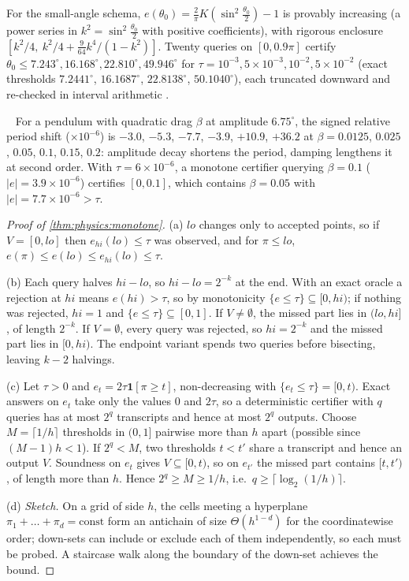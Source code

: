 For the small-angle schema, $e(\theta_0)=\frac2\pi K(\sin^2\frac{\theta_0}2)-1$ is provably
increasing (a power series in $k^2=\sin^2\frac{\theta_0}2$ with positive coefficients), with
rigorous enclosure $[k^2/4,\ k^2/4+\frac9{64}k^4/(1-k^2)]$. Twenty queries on $[0,0.9\pi]$
certify $\theta_0\le7.243^\circ,16.168^\circ,22.810^\circ,49.946^\circ$ for
$\tau=10^{-3},5\times10^{-3},10^{-2},5\times10^{-2}$ (exact thresholds $7.2441^\circ$,
$16.1687^\circ$, $22.8138^\circ$, $50.1040^\circ$), each truncated downward and re-checked in
interval arithmetic .

\begin{proposition}\ \label{prop:physics:laymon}
For a pendulum with quadratic drag $\beta$ at amplitude $6.75^\circ$, the signed relative
period shift ($\times10^{-6}$) is $-3.0$, $-5.3$, $-7.7$, $-3.9$, $+10.9$, $+36.2$ at
$\beta=0.0125$, $0.025$, $0.05$, $0.1$, $0.15$, $0.2$: amplitude decay shortens the period,
damping lengthens it at second order. With $\tau=6\times10^{-6}$, a monotone certifier querying $\beta=0.1$
($|e|=3.9\times10^{-6}$) certifies $[0,0.1]$, which contains $\beta=0.05$ with
$|e|=7.7\times10^{-6}>\tau$.
\end{proposition}

\begin{proof}[Proof of \cref{thm:physics:monotone}]
(a) $lo$ changes only to accepted points, so if $V=[0,lo]$ then $e_{hi}(lo)\le\tau$ was
observed, and for $\pi\le lo$, $e(\pi)\le e(lo)\le e_{hi}(lo)\le\tau$.

(b) Each query halves $hi-lo$, so $hi-lo=2^{-k}$ at the end. With an exact oracle a rejection
at $hi$ means $e(hi)>\tau$, so by monotonicity $\{e\le\tau\}\subseteq[0,hi)$; if nothing was
rejected, $hi=1$ and $\{e\le\tau\}\subseteq[0,1]$. If $V\neq\emptyset$, the missed part lies
in $(lo,hi]$, of length $2^{-k}$. If $V=\emptyset$, every query was rejected, so $hi=2^{-k}$
and the missed part lies in $[0,hi)$. The endpoint variant spends two queries before
bisecting, leaving $k-2$ halvings.

(c) Let $\tau>0$ and $e_t=2\tau\mathbf 1[\pi\ge t]$, non-decreasing with $\{e_t\le\tau\}=[0,t)$.
Exact answers on $e_t$ take only the values $0$ and $2\tau$, so a deterministic certifier with
$q$ queries has at most $2^q$ transcripts and hence at most $2^q$ outputs. Choose
$M=\lceil1/h\rceil$ thresholds in $(0,1]$ pairwise more than $h$ apart (possible since
$(M-1)h<1$). If $2^q<M$, two thresholds $t<t'$ share a transcript and hence an output $V$.
Soundness on $e_t$ gives $V\subseteq[0,t)$, so on $e_{t'}$ the missed part contains $[t,t')$, of
length more than $h$. Hence $2^q\ge M\ge1/h$, i.e.\ $q\ge\lceil\log_2(1/h)\rceil$.

(d) \emph{Sketch.} On a grid of side $h$, the cells meeting a hyperplane
$\pi_1+\dots+\pi_d=\mathrm{const}$ form an antichain of size $\Theta(h^{1-d})$ for the
coordinatewise order; down-sets can include or exclude each of them independently, so each
must be probed. A staircase walk along the boundary of the down-set achieves the bound.
\end{proof}

